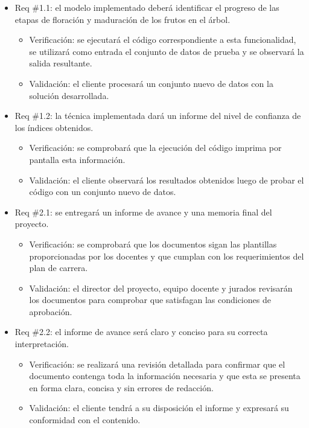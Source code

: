 \documentclass[
11pt, %
]{charter}
\begin{document}
\begin{itemize} 
\item Req \#1.1: el modelo implementado deberá identificar el progreso de las etapas de floración y
maduración de los frutos en el árbol.

\begin{itemize}
	\item Verificación: se ejecutará el código correspondiente a esta funcionalidad,
    se utilizará como entrada el conjunto de datos de prueba y se observará la salida
    resultante.
	\item Validación: el cliente procesará un conjunto nuevo de datos con la solución desarrollada.
\end{itemize}

\item Req \#1.2: la técnica implementada dará un informe del nivel de confianza de los índices obtenidos.
\begin{itemize}
	\item Verificación: se comprobará que la ejecución del código imprima por pantalla esta información.
	\item Validación: el cliente observará los resultados obtenidos luego de probar el código con
    un conjunto nuevo de datos.
\end{itemize}

\item Req \#2.1: se entregará un informe de avance y una memoria final del proyecto.
\begin{itemize}
	\item Verificación: se comprobará que los documentos sigan las plantillas proporcionadas
    por los docentes y que cumplan con los requerimientos del plan de carrera.
	\item Validación: el director del proyecto, equipo docente y jurados revisarán los documentos para 
    comprobar que satisfagan las condiciones de aprobación.
\end{itemize}

\item Req \#2.2: el informe de avance será claro y conciso para su correcta interpretación.
\begin{itemize}
	\item Verificación: se realizará una revisión detallada para confirmar que el documento
    contenga toda la información necesaria y que esta se presenta en forma clara,
    concisa y sin errores de redacción.
	\item Validación: el cliente tendrá a su disposición el informe y expresará su conformidad
    con el contenido.
\end{itemize}


\end{itemize}
\end{document}
